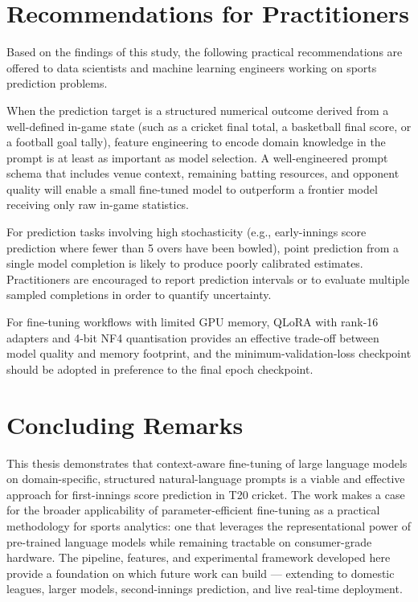 \section{Recommendations for Practitioners}

Based on the findings of this study, the following practical recommendations are offered to data scientists and machine learning engineers working on sports prediction problems.

When the prediction target is a structured numerical outcome derived from a well-defined in-game state (such as a cricket final total, a basketball final score, or a football goal tally), feature engineering to encode domain knowledge in the prompt is at least as important as model selection. A well-engineered prompt schema that includes venue context, remaining batting resources, and opponent quality will enable a small fine-tuned model to outperform a frontier model receiving only raw in-game statistics.

For prediction tasks involving high stochasticity (e.g., early-innings score prediction where fewer than 5 overs have been bowled), point prediction from a single model completion is likely to produce poorly calibrated estimates. Practitioners are encouraged to report prediction intervals or to evaluate multiple sampled completions in order to quantify uncertainty.

For fine-tuning workflows with limited GPU memory, QLoRA with rank-16 adapters and 4-bit NF4 quantisation provides an effective trade-off between model quality and memory footprint, and the minimum-validation-loss checkpoint should be adopted in preference to the final epoch checkpoint.

\section{Concluding Remarks}

This thesis demonstrates that context-aware fine-tuning of large language models on domain-specific, structured natural-language prompts is a viable and effective approach for first-innings score prediction in T20 cricket. The work makes a case for the broader applicability of parameter-efficient fine-tuning as a practical methodology for sports analytics: one that leverages the representational power of pre-trained language models while remaining tractable on consumer-grade hardware. The pipeline, features, and experimental framework developed here provide a foundation on which future work can build --- extending to domestic leagues, larger models, second-innings prediction, and live real-time deployment.
